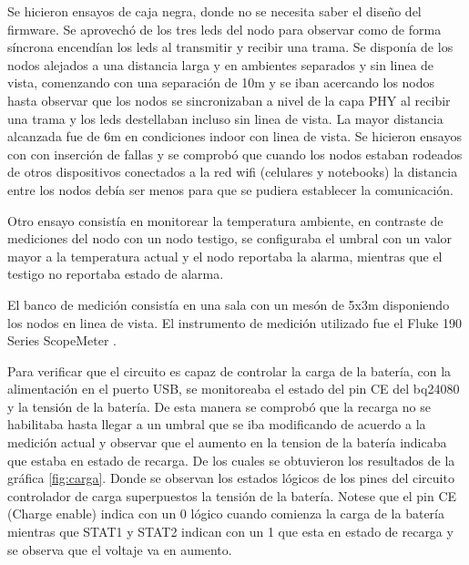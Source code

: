 Se hicieron ensayos de caja negra, donde no se necesita saber el diseño del firmware. Se aprovechó de los tres leds del nodo para observar como de forma síncrona encendían los leds al transmitir y recibir una trama. Se disponía de los nodos alejados a una distancia larga y en ambientes separados y sin linea de vista, comenzando con una separación de 10m y se iban acercando los nodos hasta observar que los nodos se sincronizaban a nivel de la capa PHY al recibir una trama y los leds destellaban incluso sin linea de vista. La mayor distancia alcanzada fue de 6m en condiciones indoor con linea de vista. Se hicieron ensayos con con inserción de fallas y se comprobó que cuando los nodos estaban rodeados de otros dispositivos conectados a la red wifi (celulares y notebooks) la distancia entre los nodos debía ser menos para que se pudiera establecer la comunicación.

Otro ensayo consistía en monitorear la temperatura ambiente, en contraste de mediciones del nodo con un nodo testigo, se configuraba el umbral con un valor mayor a la temperatura actual y el nodo reportaba la alarma, mientras que el testigo no reportaba estado de alarma.

El banco de medición consistía en una sala con un mesón de 5x3m disponiendo los nodos en linea de vista. El instrumento de medición utilizado fue el Fluke 190 Series ScopeMeter \citep{fluke}.

Para verificar que el circuito es capaz de controlar la carga de la batería, con la alimentación en el puerto USB, se monitoreaba el estado del pin CE del bq24080 y la tensión de la batería. De esta manera se comprobó que la recarga no se habilitaba hasta llegar a un umbral que se iba modificando de acuerdo a la medición actual y observar que el aumento en la tension de la batería indicaba que estaba en estado de recarga. De los cuales se obtuvieron los resultados de la gráfica \ref{fig:carga}. Donde se observan los estados lógicos de los pines del circuito controlador de carga superpuestos la tensión de la batería. Notese que el pin CE (Charge enable) indica con un 0 lógico cuando comienza la carga de la batería mientras que STAT1 y STAT2 indican con un 1 que esta en estado de recarga y se observa que el voltaje va en aumento.

